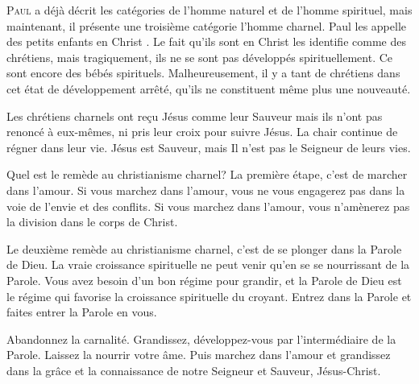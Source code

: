 
\lettrine{P}{aul} a déjà décrit les catégories de l'homme naturel
 et de l'homme spirituel, mais maintenant, il présente
 une troisième catégorie \ocadr l'homme charnel.
 Paul les appelle des \og petits enfants en Christ \fg{}.
 Le fait qu'ils sont \og en Christ \fg{} les identifie
 comme des chrétiens, mais tragiquement, ils ne se sont pas développés
 spirituellement. Ce sont encore des bébés spirituels.
 Malheureusement, il y a tant de chrétiens dans cet état
 de développement arrêté, qu'ils ne constituent même plus une nouveauté.

Les chrétiens charnels ont reçu Jésus comme leur Sauveur
 mais ils n'ont pas renoncé à eux-mêmes, ni pris leur croix pour suivre Jésus.
 La chair continue de régner dans leur vie.
 Jésus est Sauveur, mais Il n'est pas le Seigneur de leurs vies.


Quel est le remède au christianisme charnel?
 La première étape, c'est de marcher dans l'amour.
 Si vous marchez dans l'amour, vous ne vous engagerez pas
 dans la voie de l'envie et des conflits.
 Si vous marchez dans l'amour, vous n'amènerez pas
 la division dans le corps de Christ.

Le deuxième remède au christianisme charnel,
 c'est de se plonger dans la Parole de Dieu.
 La vraie croissance spirituelle ne peut venir qu'en se se nourrissant
 de la Parole. Vous avez besoin d'un bon régime pour grandir,
 et la Parole de Dieu est le régime qui favorise la croissance
 spirituelle du croyant.
 Entrez dans la Parole et faites entrer la Parole en vous.

Abandonnez la carnalité. Grandissez, développez-vous
 par l'intermédiaire de la Parole. Laissez la nourrir votre âme.
 Puis marchez dans l'amour et grandissez dans la
 grâce et la connaissance de notre Seigneur et Sauveur, Jésus-Christ.

\dvrule



